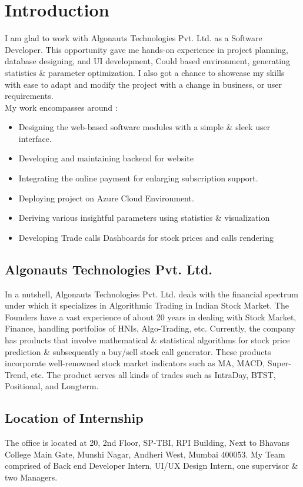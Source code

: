 \chapter{Introduction}
I am glad to work with Algonauts Technologies Pvt. Ltd. as a Software Developer. This opportunity gave me hands-on experience in project planning,  database designing, and UI development, Could based environment, generating statistics \& parameter optimization. I also got a chance to showcase my skills with ease to adapt and modify the project with a change in business, or user requirements.\\

My work encompasses around : 
\begin{itemize}
\item Designing the web-based software modules with a simple \& sleek user interface.
\item Developing and maintaining backend for website
\item Integrating the online payment for enlarging subscription support.
\item Deploying project on Azure Cloud Environment.
\item Deriving various insightful parameters using statistics \& visualization
\item Developing Trade calls Dashboards for stock prices and calls rendering
\end{itemize}

\section{Algonauts Technologies Pvt. Ltd.}
In a nutshell, Algonauts Technologies Pvt. Ltd. deals with the financial spectrum under which it specializes in Algorithmic Trading in Indian Stock Market. The Founders have a vast experience of about 20 years in dealing with Stock Market, Finance, handling portfolios of HNIs, Algo-Trading, etc.
Currently, the company has products that involve mathematical \& statistical algorithms for stock price prediction \& subsequently a buy/sell stock call generator.
These products incorporate well-renowned stock market indicators such as MA, MACD,  Super-Trend, etc.  
The product serves all kinds of trades such as IntraDay, BTST, Positional, and Longterm.
\par

\section{Location of Internship}
The office is located at 20, 2nd Floor, SP-TBI, RPI Building, Next to Bhavans College Main Gate, Munshi Nagar, Andheri West, Mumbai 400053.
My Team comprised of  Back end Developer Intern, UI/UX Design Intern, one supervisor \& two Managers.
\par

